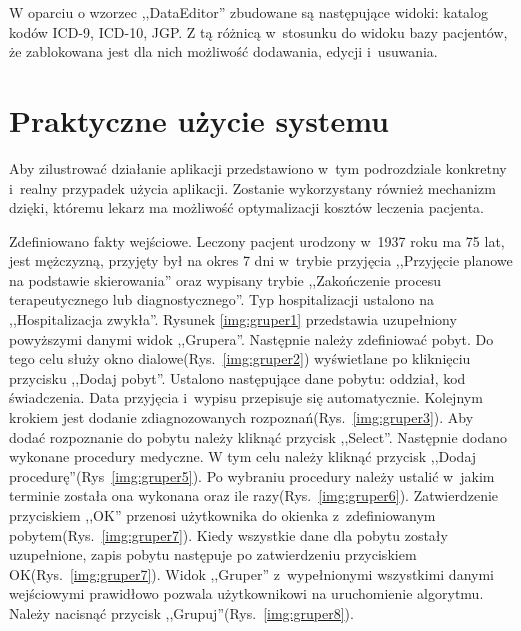 W oparciu o wzorzec ,,DataEditor'' zbudowane są następujące widoki: katalog kodów \mbox{ICD-9}, \mbox{ICD-10}, JGP. Z tą różnicą w~stosunku do widoku bazy pacjentów, że zablokowana jest dla nich możliwość dodawania, edycji i~usuwania.


\section{Praktyczne użycie systemu}
\label{sec:praktyczneUzycieSystemu}
Aby zilustrować działanie aplikacji przedstawiono w~tym podrozdziale konkretny i~realny przypadek użycia aplikacji. Zostanie wykorzystany również mechanizm dzięki, któremu lekarz ma możliwość optymalizacji kosztów leczenia pacjenta.

Zdefiniowano fakty wejściowe. Leczony pacjent urodzony w~1937 roku ma 75 lat, jest mężczyzną, przyjęty był na okres 7 dni w~trybie przyjęcia ,,Przyjęcie planowe na podstawie skierowania'' oraz wypisany trybie ,,Zakończenie procesu terapeutycznego lub diagnostycznego''. Typ hospitalizacji ustalono na ,,Hospitalizacja zwykła''. Rysunek \ref{img:gruper1} przedstawia uzupełniony powyższymi danymi widok ,,Grupera''. 
Następnie należy zdefiniować pobyt. Do tego celu służy okno dialowe(Rys.~\ref{img:gruper2}) wyświetlane po kliknięciu przycisku ,,Dodaj pobyt''. Ustalono następujące dane pobytu: oddział, kod świadczenia. Data przyjęcia i~wypisu przepisuje się automatycznie.
Kolejnym krokiem jest dodanie zdiagnozowanych rozpoznań(Rys.~\ref{img:gruper3}). Aby dodać rozpoznanie do pobytu należy kliknąć przycisk ,,Select''.
Następnie dodano wykonane procedury medyczne. W tym celu należy kliknąć przycisk ,,Dodaj procedurę''(Rys~\ref{img:gruper5}).
Po wybraniu procedury należy ustalić w~jakim terminie została ona wykonana oraz ile razy(Rys.~\ref{img:gruper6}).
Zatwierdzenie przyciskiem ,,OK'' przenosi użytkownika do okienka z~zdefiniowanym pobytem(Rys.~\ref{img:gruper7}).
Kiedy wszystkie dane dla pobytu zostały uzupełnione, zapis pobytu następuje po zatwierdzeniu przyciskiem OK(Rys.~\ref{img:gruper7}).
Widok ,,Gruper'' z~wypełnionymi wszystkimi danymi wejściowymi prawidłowo pozwala użytkownikowi na uruchomienie algorytmu. Należy nacisnąć przycisk ,,Grupuj''(Rys.~\ref{img:gruper8}).

